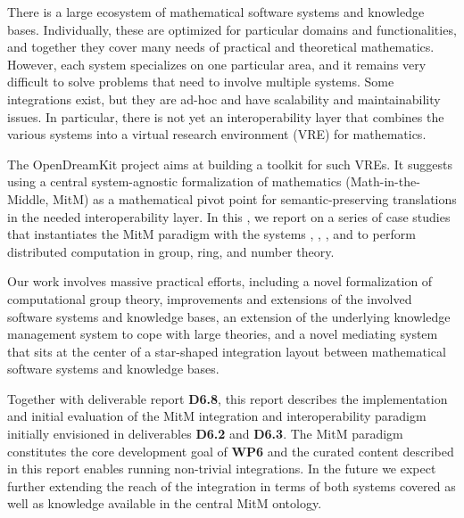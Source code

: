 There is a large ecosystem of mathematical software systems and knowledge bases.
Individually, these are optimized for particular domains and functionalities, and together they cover many needs of practical and theoretical mathematics.
However, each system specializes on one particular area, and it remains very difficult to solve problems that need to involve multiple systems.
Some integrations exist, but they are ad-hoc and have scalability and maintainability issues.
In particular, there is not yet an interoperability layer that combines the various systems into a virtual research environment (VRE) for mathematics.
  
The OpenDreamKit project aims at building a toolkit for such VREs.
It suggests using a central system-agnostic formalization of mathematics (Math-in-the-Middle, MitM) as a mathematical pivot point for semantic-preserving translations in the needed interoperability layer.
In this \papertype, we report on a series of case studies that instantiates the MitM paradigm with the systems \GAP, \Sage, \LMFDB, and \Singular to perform distributed computation in group, ring, and number theory.
 
Our work involves massive practical efforts, including a novel formalization of computational group theory, improvements and extensions of the involved software systems and knowledge bases, an extension of the underlying knowledge management system to cope with large theories, and a novel mediating system that sits at the center of a star-shaped integration layout between mathematical software systems and knowledge bases.

Together with deliverable report \textbf{D6.8}, this report describes the implementation and initial evaluation of the MitM integration and interoperability paradigm initially envisioned in deliverables \textbf{D6.2} and \textbf{D6.3}.
The MitM paradigm constitutes the core development goal of \textbf{WP6} and the curated content described in this report enables running non-trivial integrations.
In the future we expect further extending the reach of the integration in terms of both systems covered as well as knowledge available in the central MitM ontology.


